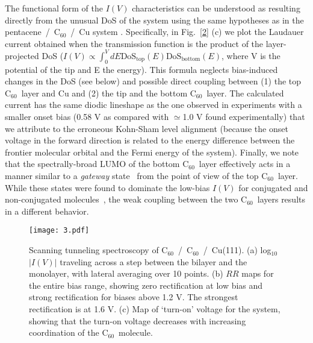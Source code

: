 \documentclass[11pt,showpacs,amsmath,amssymbl]{revtex4}
\newcommand{\buck}{C$_{60}$~}
\begin{document}
The functional form of the $I(V)$ characteristics can be understood as resulting directly from the unusual DoS of the system using the same hypotheses as in the pentacene~/~\buck/~Cu system \cite{smerdon2016large}. Specifically, in Fig.~\ref{2} (c) we plot the Laudauer current obtained when the transmission function is the product of the layer-projected DoS ($I\left(V\right)\propto \int^{V}_{0} dE \textrm{DoS}_{\textrm{top}} \left(E\right)\textrm{DoS}_{\textrm{bottom}} \left(E\right)$, where V is the potential of the tip and E the energy). This formula neglects bias-induced changes in the DoS (see below) and possible direct coupling between (1) the top \buck layer and Cu and (2) the tip and the bottom \buck layer. The calculated current has the same diodic lineshape as the one observed in experiments with a smaller onset bias (0.58 V as compared with $\simeq$1.0 V found experimentally) that we attribute to the erroneous Kohn-Sham level alignment (because the onset voltage in the forward direction is related to the energy difference between the frontier molecular orbital and the Fermi energy of the system). Finally, we note that the spectrally-broad LUMO of the bottom \buck layer effectively acts in a manner similar to a \textit{gateway} state~\cite{widawsky} from the point of view of the top \buck layer. While these states were found to dominate the low-bias $I(V)$ for conjugated and non-conjugated molecules~\cite{widawsky}, the weak coupling between the two \buck layers results in a different behavior.     
%


\begin{figure}
\texttt{[image: 3.pdf]}
\caption{Scanning tunneling spectroscopy of \buck/~\buck/~Cu(111). (a) log$_{10}$$|I(V)|$ traveling across a step between the bilayer and the monolayer, with lateral averaging over 10 points. (b) $RR$ maps for the entire bias range, showing zero rectification at low bias and strong rectification for biases above 1.2 V.  The strongest rectification is at 1.6 V. (c) Map of `turn-on' voltage for the system, showing that the turn-on voltage decreases with increasing coordination of the \buck molecule. }
\label{3}
\end{figure}
\end{document}
